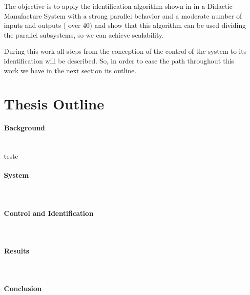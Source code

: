 The objective is to apply the identification algorithm shown in
\cite{moreira2018enhanced} in a Didactic Manufacture
System with a strong parallel behavior and a moderate number of inputs and
outputs ( over 40) and show that this algorithm can be used
dividing the parallel subsystems, so we can achieve scalability. 


During this work all steps from the conception of the control of the system to
its identification will be described. So, in order to ease the path throughout this work we have
in the next section its outline.

\section{Thesis Outline}
\label{sec:thesisOutline}

\paragraph{Background} ~\\
teste

\paragraph{System} ~\\
\paragraph{Control and Identification} ~\\


\paragraph{Results} ~\\

\paragraph{Conclusion} ~\\

